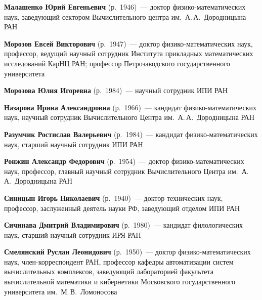 \begin{multicols}{2}
\vspace*{4pt}

\noindent
\textbf{Малашенко Юрий Евгеньевич} (р.\ 1946)~--- доктор фи\-зи\-ко-ма\-те\-ма\-ти\-че\-ских наук, 
заведующий сектором Вычислительного центра им.\ А.\,А.~Дородницына РАН

\vspace*{4pt}

\noindent
\textbf{Морозов Евсей Викторович} (р.\ 1947)~--- доктор фи\-зи\-ко-ма\-те\-ма\-ти\-че\-ских 
наук, профессор, ведущий научный сотрудник Института прикладных математических исследований 
КарНЦ РАН; профессор Петрозаводского государственного университета 


\vspace*{4pt}

\noindent
\textbf{Морозова Юлия Игоревна} (р.\ 1984)~--- научный сотрудник ИПИ РАН


\vspace*{4pt}


\noindent
\textbf{Назарова Ирина Александровна} (р.\ 1966)~--- кандидат фи\-зи\-ко-ма\-те\-ма\-ти\-че\-ских наук, 
научный сотрудник Вычислительного Центра им.\ А.\,А.~Дородницына РАН 

\vspace*{4pt}

\noindent
\textbf{Разумчик Ростислав Валерьевич} (р.\ 1984)~--- кандидат фи\-зи\-ко-ма\-те\-ма\-ти\-че\-ских 
наук, старший научный сотрудник ИПИ РАН

\vspace*{4pt}

\noindent
\textbf{Ронжин Александр Федорович} (р.\ 1954)~--- доктор фи\-зи\-ко-ма\-те\-ма\-ти\-че\-ских наук,  
профессор, главный научный сотрудник Вычислительного Центра им.\ А.\,А.~Дородницына РАН

\vspace*{4pt}

\noindent
\textbf{Синицын Игорь Николаевич} (р.\ 1940)~--- 
доктор технических наук, профессор, заслуженный деятель науки РФ, заведующий отделом
ИПИ РАН

\vspace*{4pt}

\noindent
\textbf{Сичинава Дмитрий Владимирович} (р.\ 1980)~--- кандидат филологических наук, 
старший научный сотрудник ИРЯ РАН

\vspace*{4pt}

\noindent
\textbf{Смелянский Руслан Леонидович} (р.\ 1950)~--- доктор фи\-зи\-ко-ма\-те\-ма\-ти\-че\-ских 
наук, член-кор\-рес\-пон\-дент РАН, профессор кафедры автоматизации систем вычислительных комплексов, 
заведующий лабораторией факультета вычислительной математики и кибернетики Московского 
государственного университета им.\ М.\,В.~Ломоносова


\end{multicols}

